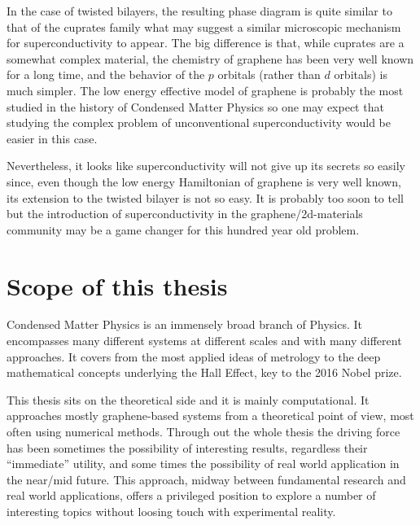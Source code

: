 In the case of twisted bilayers, the resulting phase diagram is quite similar to that of the cuprates family what may suggest a similar microscopic mechanism for superconductivity to appear. The big difference is that, while cuprates are a somewhat complex material, the chemistry of graphene has been very well known for a long time, and the behavior of the $p$ orbitals (rather than $d$ orbitals) is much simpler.
The low energy effective model of graphene is probably the most studied in the history of Condensed Matter Physics so one may expect that studying the complex problem of unconventional superconductivity would be easier in this case.

Nevertheless, it looks like superconductivity will not give up its secrets so easily since, even though the low energy Hamiltonian of graphene is very well known, its extension to the twisted bilayer is not so easy.
It is probably too soon to tell but the introduction of superconductivity in the graphene/2d-materials community may be a game changer for this hundred year old problem. %


\section{Scope of this thesis}
Condensed Matter Physics is an immensely broad branch of Physics. It encompasses many different systems at different scales and with many different approaches.
It covers from the most applied ideas of metrology to the deep mathematical concepts underlying the Hall Effect, key to the 2016 Nobel prize.

This thesis sits on the theoretical side and it is mainly computational.
It approaches mostly graphene-based systems from a theoretical point of view, most often using numerical methods.
Through out the whole thesis the driving force has been sometimes the possibility of interesting results, regardless their ``immediate'' utility, and some times the possibility of real world application in the near/mid future.
This approach, midway between fundamental research and real world applications, offers a privileged position to explore a number of interesting topics without loosing touch with experimental reality.
\bigskip


